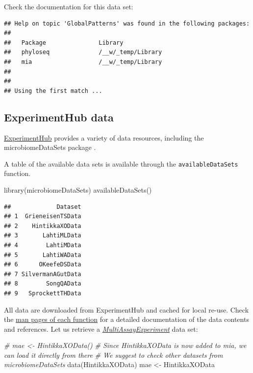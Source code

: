 \documentclass[
]{book}
\newenvironment{Shaded}{\begin{snugshade}}{\end{snugshade}}
\newcommand{\CommentTok}[1]{\textcolor[rgb]{0.56,0.35,0.01}{\textit{#1}}}
\newcommand{\FunctionTok}[1]{\textcolor[rgb]{0.00,0.00,0.00}{#1}}
\newcommand{\NormalTok}[1]{#1}
\newcommand{\OtherTok}[1]{\textcolor[rgb]{0.56,0.35,0.01}{#1}}
\begin{document}
Check the documentation for this data set:

\begin{verbatim}
## Help on topic 'GlobalPatterns' was found in the following packages:
## 
##   Package               Library
##   phyloseq              /__w/_temp/Library
##   mia                   /__w/_temp/Library
## 
## 
## Using the first match ...
\end{verbatim}

\hypertarget{experimenthub-data}{%
\subsection{ExperimentHub data}\label{experimenthub-data}}

\href{https://bioconductor.org/packages/release/bioc/vignettes/ExperimentHub/inst/doc/ExperimentHub.html}{ExperimentHub}
provides a variety of data resources, including the
microbiomeDataSets package \citep{Morgan2021, microlahti2021}.

A table of the available data sets is available through the \texttt{availableDataSets}
function.

\begin{Shaded}
\begin{Highlighting}[]
\FunctionTok{library}\NormalTok{(microbiomeDataSets)}
\FunctionTok{availableDataSets}\NormalTok{()}
\end{Highlighting}
\end{Shaded}

\begin{verbatim}
##             Dataset
## 1  GrieneisenTSData
## 2    HintikkaXOData
## 3       LahtiMLData
## 4        LahtiMData
## 5       LahtiWAData
## 6      OKeefeDSData
## 7 SilvermanAGutData
## 8        SongQAData
## 9   SprockettTHData
\end{verbatim}

All data are downloaded from ExperimentHub and cached for local
re-use. Check the \href{https://microbiome.github.io/microbiomeDataSets/reference/index.html}{man pages of each
function}
for a detailed documentation of the data contents and references. Let
us retrieve a \emph{\href{https://bioconductor.org/packages/3.15/MultiAssayExperiment}{MultiAssayExperiment}} data set:

\begin{Shaded}
\begin{Highlighting}[]
\CommentTok{\# mae \textless{}{-} HintikkaXOData()}
\CommentTok{\# Since HintikkaXOData is now added to mia, we can load it directly from there}
\CommentTok{\# We suggest to check other datasets from microbiomeDataSets}
\FunctionTok{data}\NormalTok{(HintikkaXOData)}
\NormalTok{mae }\OtherTok{\textless{}{-}}\NormalTok{ HintikkaXOData}
\end{Highlighting}
\end{Shaded}
\end{document}

